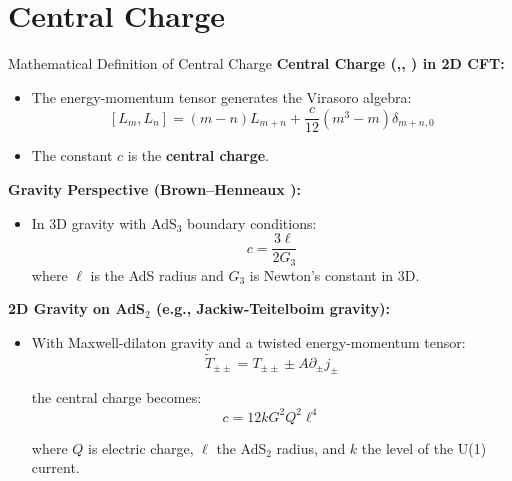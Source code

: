 \section{Central Charge}


\begin{frame}[allowframebreaks]{Mathematical Definition of Central Charge}
    \textbf{Central Charge (\cite{Brown:1986nw},\cite{Hartman:2008dq}, \cite{Rathi:2024}) in 2D CFT:}
\begin{itemize}
  \item The energy-momentum tensor generates the Virasoro algebra:
  \[\left[L_m, L_n\right] = (m - n)L_{m+n} + \frac{c}{12}(m^3 - m)\delta_{m+n, 0}\]

  \item The constant \( c \) is the \textbf{central charge}.
\end{itemize}

\textbf{Gravity Perspective (Brown–Henneaux \cite{Brown:1986nw}):}
\begin{itemize}
  \item In 3D gravity with AdS\(_3\) boundary conditions:
  \[c = \frac{3\ell}{2G_3}\]
  where \( \ell \) is the AdS radius and \( G_3 \) is Newton's constant in 3D.
\end{itemize}

\textbf{2D Gravity on AdS\(_2\) \cite{Castro:2008ne} (e.g., Jackiw-Teitelboim gravity):}
\begin{itemize}
  \item With Maxwell-dilaton gravity and a twisted energy-momentum tensor:
  \[\tilde{T}_{\pm\pm} = T_{\pm\pm} \pm A \partial_\pm j_\pm\]

  the central charge becomes:
  \[c = 12kG^2Q^2\ell^4\] 

  where \( Q \) is electric charge, \( \ell \) the AdS\(_2\) radius, and \( k \) the level of the U(1) current.
\end{itemize}
\end{frame}

